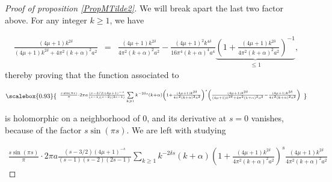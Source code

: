 \documentclass{jams-l}
\theoremstyle{definition}
\theoremstyle{remark}
\numberwithin{equation}{section}
\newcommand\scalemath[2]{\scalebox{#1}{\mbox{\ensuremath{\displaystyle #2}}}}
\begin{document}
\begin{proof}[Proof of proposition \ref{PropMTilde2}]
                        \noindent We will break apart the last two factor above. For any integer $k \geqslant 1$, we have
                        
                        \[ \begin{array}{lll}
                                \scriptstyle \frac{\left( 4 \mu + 1 \right) k^{2 \delta}}{\left( 4 \mu + 1 \right) k^{2 \delta} + 4 \pi^2 \left( k + \alpha \right)^2 a^2} & \scriptstyle = & \scriptstyle \frac{\left( 4 \mu + 1 \right) k^{2 \delta}}{4 \pi^2 \left( k + \alpha \right)^2 a^2} - \frac{\left( 4 \mu + 1 \right)^2 k^{4 \delta}}{16 \pi^4 \left( k + \alpha \right)^4 a^4} \underbrace{\scriptstyle \left( 1 + \frac{\left( 4 \mu + 1 \right) k^{2 \delta}}{4 \pi^2 \left( k + \alpha \right)^2 a^2} \right)^{-1}}_{\scriptstyle \leqslant 1},
                            \end{array} \]
                        \noindent thereby proving that the function associated to
                        
                        \[ \scalemath{0.93}{\begin{array}{c}
                                \scriptstyle \frac{s \sin \left( \pi s \right)}{\pi} \cdot 2 \pi a \frac{\left( s-3/2 \right) \left( 4 \mu + 1 \right)^{-s}}{\left( s-1 \right) \left( s-2 \right) \left( 2s-1 \right)} \sum\limits_{k \geqslant 1} k^{- 2 \delta s} \left( k + \alpha \right) \left( 1 + \frac{\left( 4 \mu + 1 \right) k^{2 \delta}}{4 \pi^2 \left( k + \alpha \right)^2 a^2} \right)^s \left( \frac{\left( 4 \mu + 1 \right) k^{2 \delta}}{\left( 4 \mu + 1 \right) k^{2 \delta} + 4 \pi^2 \left( k + \alpha \right)^2 a^2} - \frac{\left( 4 \mu + 1 \right) k^{2 \delta}}{4 \pi^2 \left( k + \alpha \right)^2 a^2} \right)
                            \end{array}} \]
                        
                        \noindent is holomorphic on a neighborhood of $0$, and its derivative at $s=0$ vanishes, because of the factor $s \sin \left( \pi s \right)$. We are left with studying
                        
                        \[ \begin{array}{c}
                                \frac{s \sin \left( \pi s \right)}{\pi} \cdot 2 \pi a \frac{\left( s-3/2 \right) \left( 4 \mu + 1 \right)^{-s}}{\left( s-1 \right) \left( s-2 \right) \left( 2s-1 \right)} \sum\limits_{k \geqslant 1} k^{- 2 \delta s} \left( k + \alpha \right) \left( 1 + \frac{\left( 4 \mu + 1 \right) k^{2 \delta}}{4 \pi^2 \left( k + \alpha \right)^2 a^2} \right)^s \frac{\left( 4 \mu + 1 \right) k^{2 \delta}}{4 \pi^2 \left( k + \alpha \right)^2 a^2}
                            \end{array} \]
                        

\end{proof}
\end{document}
